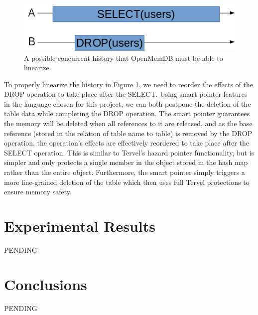 \documentclass[letter,11pt]{article}
\begin{document}
\begin{figure}[h]
\centering
  \includegraphics[scale=.75]{concurrent_history_1}
  \caption{A possible concurrent history that OpenMemDB must be able to linearize}
  \label{concurrent_history}
\end{figure}

\par\vspace{\baselineskip}
To properly linearize the history in Figure \ref{concurrent_history}, we need to reorder 
the effects of the DROP operation to take place after the SELECT. Using smart pointer features 
in the language chosen for this project, we can both postpone the deletion of the 
table data while completing the DROP operation. The smart pointer guarantees the memory will 
be deleted when all references to it are released, and as the base reference (stored in the 
relation of table name to table) is removed by the DROP operation, the operation's effects 
are effectively reordered to take place after the SELECT operation. This is similar to Tervel's 
hazard pointer functionality, but is simpler and only protects a single member in the object stored
in the hash map rather than the entire object. Furthermore, the smart pointer simply triggers a 
more fine-grained deletion of the table which then uses full Tervel protections to ensure memory
safety.

\section{Experimental Results}
PENDING

\section{Conclusions}
PENDING

\newpage


\newpage
\end{document}
